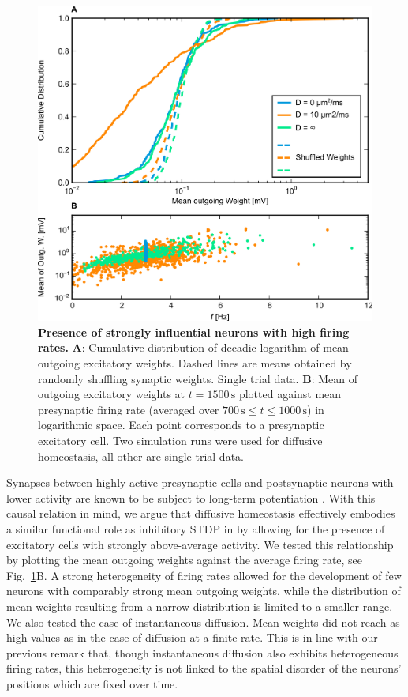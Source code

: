 \documentclass[10pt,letterpaper]{article}
\begin{document}
\begin{figure}
\includegraphics[width=\textwidth]{./figures/outgoing_weights_comp_new_cumsum.png}
\caption{{\bf Presence of strongly influential neurons with high firing rates.} \textbf{A}: Cumulative distribution of decadic logarithm of mean outgoing excitatory weights. Dashed lines are means obtained by randomly shuffling synaptic weights. Single trial data. \textbf{B}: Mean of outgoing excitatory weights at $t=\mathrm{1500\,s}$ plotted against mean presynaptic firing rate (averaged over $\mathrm{700\,s \leq} t \mathrm{ \leq 1000\,s}$) in logarithmic space. Each point corresponds to a presynaptic excitatory cell. Two simulation runs were used for diffusive homeostasis, all other are single-trial data.}
\label{Outgoing_Weights_Comp}
\end{figure}

Synapses between highly active presynaptic cells and postsynaptic neurons with lower activity are known to be subject to long-term potentiation \cite{Sjoestroem_Syn_Plasticity_2001,Feldman_STDP_2012}. With this causal relation in mind, we argue that diffusive homeostasis effectively embodies a similar functional role as inhibitory STDP in \cite{Effenberger_2015} by allowing for the presence of excitatory cells with strongly above-average activity. We tested this relationship by plotting the mean outgoing weights against the average firing rate, see Fig.~\ref{Outgoing_Weights_Comp}B. A strong heterogeneity of firing rates allowed for the development of few neurons with comparably strong mean outgoing weights, while the distribution of mean weights resulting from a narrow distribution is limited to a smaller range. We also tested the case of instantaneous diffusion. Mean weights did not reach as high values as in the case of diffusion at a finite rate. This is in line with our previous remark that, though instantaneous diffusion also exhibits heterogeneous firing rates, this heterogeneity is not linked to the spatial disorder of the neurons' positions which are fixed over time.
\end{document}
